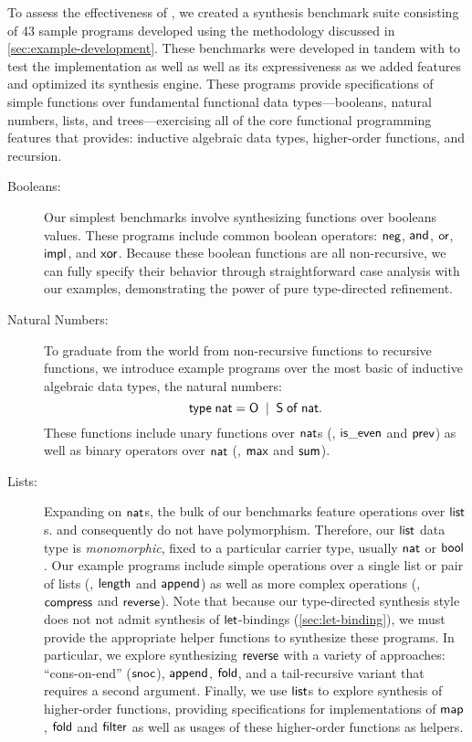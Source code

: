 To assess the effectiveness of \myth{}, we created a synthesis benchmark suite consisting of 43 sample \myth{} programs developed using the methodology discussed in \autoref{sec:example-development}.
These benchmarks were developed in tandem with \myth{} to test the implementation as well as well as its expressiveness as we added features and optimized its synthesis engine.
These programs provide specifications of simple functions over fundamental functional data types---booleans, natural numbers, lists, and trees---exercising all of the core functional programming features that \myth{} provides: inductive algebraic data types, higher-order functions, and recursion.
\begin{description}
  \item[Booleans:]
    Our simplest benchmarks involve synthesizing functions over booleans values.
    These programs include common boolean operators: $\mathsf{neg}$, $\mathsf{and}$, $\mathsf{or}$, $\mathsf{impl}$, and $\mathsf{xor}$.
    Because these boolean functions are all non-recursive, we can fully specify their behavior through straightforward case analysis with our examples, demonstrating the power of pure type-directed refinement.

  \item[Natural Numbers:]
    To graduate from the world from non-recursive functions to recursive functions, we introduce example programs over the most basic of inductive algebraic data types, the natural numbers:
    \[
      \mathsf{type}\;\mathsf{nat} = \mathsf{O} \;\mathrel{\mid}\; \mathsf{S}\;\mathsf{of}\;\mathsf{nat}.
    \]
    These functions include unary functions over $\mathsf{nat}$s (\eg, $\mathsf{is\_even}$ and $\mathsf{prev}$) as well as binary operators over $\mathsf{nat}$ (\eg, $\mathsf{max}$ and $\mathsf{sum}$).

  \item[Lists:]
    Expanding on $\mathsf{nat}$s, the bulk of our benchmarks feature operations over $\mathsf{list}$s.
    \mlsyn{} and consequently \myth{} do not have polymorphism.
    Therefore, our $\mathsf{list}$ data type is \emph{monomorphic}, fixed to a particular carrier type, usually $\mathsf{nat}$ or $\mathsf{bool}$.
    Our example programs include simple operations over a single list or pair of lists (\eg, $\mathsf{length}$ and $\mathsf{append}$) as well as more complex operations (\eg, $\mathsf{compress}$ and $\mathsf{reverse}$).
    Note that because our type-directed synthesis style does not not admit synthesis of $\mathsf{let}$-bindings (\autoref{sec:let-binding}), we must provide the appropriate helper functions to synthesize these programs.
    In particular, we explore synthesizing $\mathsf{reverse}$ with a variety of approaches: ``cons-on-end'' ($\mathsf{snoc}$), $\mathsf{append}$, $\mathsf{fold}$, and a tail-recursive variant that requires a second argument.
    Finally, we use $\mathsf{list}$s to explore synthesis of higher-order functions, providing specifications for implementations of $\mathsf{map}$, $\mathsf{fold}$ and $\mathsf{filter}$ as well as usages of these higher-order functions as helpers.


\end{description}
